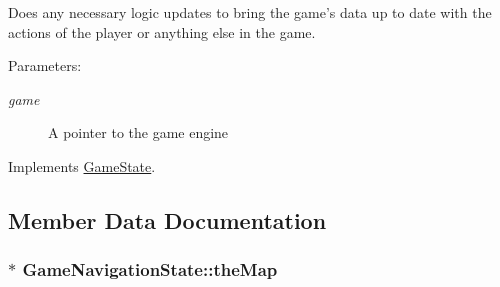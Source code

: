 Does any necessary logic updates to bring the game's data up to date with the actions of the player or anything else in the game.

\begin{Desc}
\item[Parameters:]
\begin{description}
\item[{\em game}]A pointer to the game engine \end{description}
\end{Desc}


Implements \hyperlink{class_game_state_100ca49bc95afce1d5c5b756708bbc2b}{GameState}.

\subsection{Member Data Documentation}
\hypertarget{class_game_navigation_state_83154f9523275696f30c13447e1d74f3}{
\subsubsection[{theMap}]{$\ast$ {\bf GameNavigationState::theMap}}}
\label{de/d2a/class_game_navigation_state_83154f9523275696f30c13447e1d74f3}


